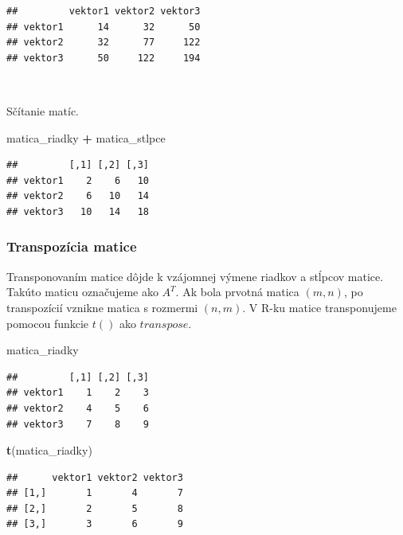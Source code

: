 \documentclass[]{article}
\newenvironment{Shaded}{\begin{snugshade}}{\end{snugshade}}
\newcommand{\KeywordTok}[1]{\textcolor[rgb]{0.13,0.29,0.53}{\textbf{#1}}}
\newcommand{\NormalTok}[1]{#1}
\newcommand{\OperatorTok}[1]{\textcolor[rgb]{0.81,0.36,0.00}{\textbf{#1}}}
\newcommand{\StringTok}[1]{\textcolor[rgb]{0.31,0.60,0.02}{#1}}
\begin{document}
\begin{verbatim}
##         vektor1 vektor2 vektor3
## vektor1      14      32      50
## vektor2      32      77     122
## vektor3      50     122     194
\end{verbatim}

~

Sčítanie matíc.

\begin{Shaded}
\begin{Highlighting}[]
\NormalTok{matica_riadky }\OperatorTok{+}\StringTok{ }\NormalTok{matica_stlpce}
\end{Highlighting}
\end{Shaded}

\begin{verbatim}
##         [,1] [,2] [,3]
## vektor1    2    6   10
## vektor2    6   10   14
## vektor3   10   14   18
\end{verbatim}

\hypertarget{transpozuxedcia-matice}{%
\subsubsection{Transpozícia matice}\label{transpozuxedcia-matice}}

Transponovaním matice dôjde k vzájomnej výmene riadkov a stĺpcov matice.
Takúto maticu označujeme ako \(A^T\). Ak bola prvotná matica \((m, n)\),
po transpozícií vznikne matica s rozmermi \((n, m)\). V R-ku matice
transponujeme pomocou funkcie \(t()\) ako \(transpose\).

\begin{Shaded}
\begin{Highlighting}[]
\NormalTok{matica_riadky}
\end{Highlighting}
\end{Shaded}

\begin{verbatim}
##         [,1] [,2] [,3]
## vektor1    1    2    3
## vektor2    4    5    6
## vektor3    7    8    9
\end{verbatim}

\begin{Shaded}
\begin{Highlighting}[]
\KeywordTok{t}\NormalTok{(matica_riadky)}
\end{Highlighting}
\end{Shaded}

\begin{verbatim}
##      vektor1 vektor2 vektor3
## [1,]       1       4       7
## [2,]       2       5       8
## [3,]       3       6       9
\end{verbatim}
\end{document}
